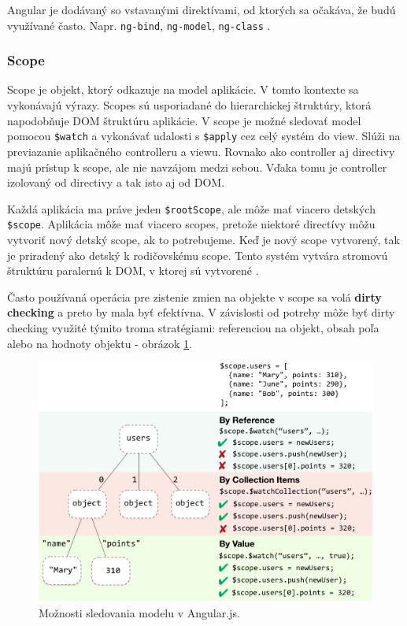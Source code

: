 Angular je dodávaný so vstavanými direktívami, od ktorých sa očakáva, že budú využívané často. Napr. \verb|ng-bind|, \verb|ng-model|, \verb|ng-class| \cite{angular-docs}.

\subsubsection{Scope}
Scope je objekt, ktorý odkazuje na model aplikácie. V tomto kontexte sa vykonávajú výrazy. Scopes sú usporiadané do hierarchickej štruktúry, ktorá napodobňuje DOM štruktúru aplikácie. V scope je možné sledovať model pomocou \verb|$watch| a vykonávať udalosti s \verb|$apply| cez celý systém do view. Slúži na previazanie aplikačného controlleru a viewu. Rovnako ako controller aj directivy majú prístup k scope, ale nie navzájom medzi sebou. Vďaka tomu je controller izolovaný od directivy a tak isto aj od DOM.

Každá aplikácia ma práve jeden \verb|$rootScope|, ale môže mať viacero detských \verb|$scope|. Aplikácia môže mať viacero scopes, pretože niektoré directívy môžu vytvoriť nový detský scope, ak to potrebujeme. Keď je nový scope vytvorený, tak je priradený ako detský k rodičovskému scope. Tento systém vytvára stromovú štruktúru paralernú k DOM, v ktorej sú vytvorené \cite{angular-docs}.

Často používaná operácia pre zistenie zmien na objekte v scope sa volá \textbf{dirty checking} a preto by mala byť efektívna. V závislosti od potreby môže byť dirty checking využité týmito troma stratégiami: referenciou na objekt, obsah poľa alebo na hodnoty objektu - obrázok \ref{img-angular-watch}.

\begin{figure}[H]
  \centering
  \includegraphics[scale=0.7]{img/angular/concepts-scope-watch-strategies.png}
  \caption{Možnosti sledovania modelu v Angular.js.}
  \label{img-angular-watch}
\end{figure}

